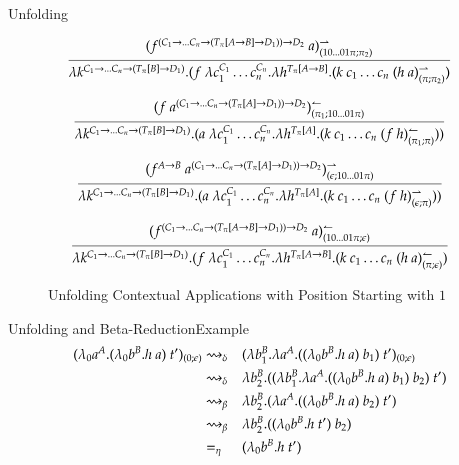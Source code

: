 \documentclass[9pt]{beamer}
\begin{document}
\begin{frame}{Unfolding}
\begin{figure}[h!]
\begin{calculus}
$$
\infer{ \lambda k^{C_1 \imp \ldots C_n \imp (T_{\pi}[B] \imp D_1)}. (f \ \lambda c_1^{C_1} \ldots c_n^{C_n}. \lambda h^{T_{\pi}[A \imp B]}. (k \ c_1 \ldots c_n \ (h \ a)^{\rightharpoonup}_{(\pi;\pi_2)}) }
{(f^{(C_1 \imp \ldots C_n \imp (T_{\pi}[A \imp B] \imp D_1)) \imp D_2} \ a)^{\rightharpoonup}_{(10\ldots01\pi;\pi_2)} }
$$

$$
\infer{ \lambda k^{C_1 \imp \ldots C_n \imp (T_{\pi}[B] \imp D_1)}. (a \ \lambda c_1^{C_1} \ldots c_n^{C_n}. \lambda h^{T_{\pi}[A]}. (k \ c_1 \ldots c_n \ (f \ h)^{\leftharpoonup}_{(\pi_1;\pi)})) }
{ (f \ a^{(C_1 \imp \ldots C_n \imp (T_{\pi}[A] \imp D_1))\imp D_2})^{\leftharpoonup}_{(\pi_1;10\ldots01\pi)} }
$$

$$
\infer{ \lambda k^{C_1 \imp \ldots C_n \imp (T_{\pi}[B] \imp D_1)}. (a \ \lambda c_1^{C_1} \ldots c_n^{C_n}. \lambda h^{T_{\pi}[A]}. (k \ c_1 \ldots c_n \ (f \ h)^{\rightharpoonup}_{(\eS;\pi)})) }
{ (f^{A \imp B} \ a^{(C_1 \imp \ldots C_n \imp (T_{\pi}[A] \imp D_1))\imp D_2})^{\rightharpoonup}_{(\eS;10\ldots01\pi)} }
$$

$$
\infer{ \lambda k^{C_1 \imp \ldots C_n \imp (T_{\pi}[B] \imp D_1)}. (f \ \lambda c_1^{C_1} \ldots c_n^{C_n}. \lambda h^{T_{\pi}[A \imp B]}. (k \ c_1 \ldots c_n \ (h \ a)^{\leftharpoonup}_{(\pi;\eS)}) }
{ (f^{(C_1 \imp \ldots C_n \imp (T_{\pi}[A \imp B] \imp D_1)) \imp D_2} \ a)^{\leftharpoonup}_{(10\ldots01\pi;\eS)} }
$$
\end{calculus}
\caption{Unfolding Contextual Applications with Position Starting with $1$}
\label{figure:Unfolding}
\end{figure}
\end{frame}


\begin{frame}{Unfolding and Beta-Reduction}{Example}
\begin{align*}
(\lambda_0 a^A. (\lambda_0 b^B.h \ a) \ t')_{(0;\eS)} & \unfold && (\lambda b_1^B. \lambda a^A. ((\lambda_0 b^B.h \ a) \ b_1) \ t')_{(0;\eS)}  \\
				  & \unfold &&  \lambda b_2^B.((\lambda b_1^B. \lambda a^A. ((\lambda_0 b^B.h \ a) \ b_1) \ b_2) \ t') \\
				  & \br && \lambda b_2^B. (\lambda a^A. ((\lambda_0 b^B.h \ a) \ b_2) \ t')  \\
				  & \br && \lambda b_2^B. ((\lambda_0 b^B.h \ t') \ b_2)  \\
				  & =_{\eta} && (\lambda_0 b^B.h \ t')
\end{align*} 
\end{frame}
\end{document}

